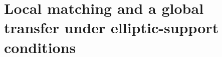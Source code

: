 \begingroup
\providecommand{\ov}{}\renewcommand{\ov}[1]{\overline{#1}}
\providecommand{\eps}{}\renewcommand{\eps}{\epsilon}
\providecommand{\A}{}\renewcommand{\A}{\mathbb{A}}
\providecommand{\C}{}\renewcommand{\C}{\mathbb{C}}
\providecommand{\Q}{}\renewcommand{\Q}{\mathbb{Q}}
\providecommand{\Z}{}\renewcommand{\Z}{\mathbb{Z}}
\providecommand{\cO}{}\renewcommand{\cO}{\mathcal{O}}
\providecommand{\gen}{}\renewcommand{\gen}{\mathrm{gen}}
\providecommand{\reg}{}\renewcommand{\reg}{\mathrm{reg}}
\providecommand{\tr}{}\renewcommand{\tr}{\operatorname{tr}}
\providecommand{\Gal}{}\renewcommand{\Gal}{\operatorname{Gal}}
\providecommand{\Aut}{}\renewcommand{\Aut}{\operatorname{Aut}}
\providecommand{\Nrd}{}\renewcommand{\Nrd}{\operatorname{Nrd}}
\providecommand{\Ad}{}\renewcommand{\Ad}{\operatorname{Ad}}
\providecommand{\Hom}{}\renewcommand{\Hom}{\operatorname{Hom}}
\providecommand{\Iso}{}\renewcommand{\Iso}{\operatorname{Iso}}
\providecommand{\vol}{}\renewcommand{\vol}{\operatorname{vol}}
\providecommand{\supp}{}\renewcommand{\supp}{\operatorname{supp}}
\providecommand{\diag}{}\renewcommand{\diag}{\operatorname{diag}}
\providecommand{\GL}{}\renewcommand{\GL}{\mathrm{GL}}
\providecommand{\SL}{}\renewcommand{\SL}{\mathrm{SL}}
\providecommand{\Gb}{}\renewcommand{\Gb}{\ov{G}}
\providecommand{\Zb}{}\renewcommand{\Zb}{\ov{Z}}
\providecommand{\GDb}{}\renewcommand{\GDb}{\ov{G}_D}
\providecommand{\pib}{}\renewcommand{\pib}{\ov{\pi}}
\providecommand{\ks}{}\renewcommand{\ks}{\kappa^{*}}
\providecommand{\Eb}{}\renewcommand{\Eb}{\ov{E}}
\providecommand{\Tb}{}\renewcommand{\Tb}{\ov{T}}
\providecommand{\cG}{}\renewcommand{\cG}{\mathcal{G}}
\providecommand{\cGb}{}\renewcommand{\cGb}{\ov{\mathcal{G}}}
\providecommand{\iD}{}\renewcommand{\iD}{\iota_D}
\providecommand{\iG}{}\renewcommand{\iG}{\iota_{\GL}}
\providecommand{\jj}{}\renewcommand{\jj}{\jmath}
\providecommand{\Pv}{}\renewcommand{\Pv}{\textbf{(P)}}
\providecommand{\Ev}{}\renewcommand{\Ev}{\textbf{(E)}}
\providecommand{\Ov}{}\renewcommand{\Ov}{\textbf{(O)}}
\providecommand{\Cv}{}\renewcommand{\Cv}{\textbf{(C)}}
\chapter[Local matching and global transfer]{Local matching and a global transfer under elliptic-support conditions}\label{ch:I}
